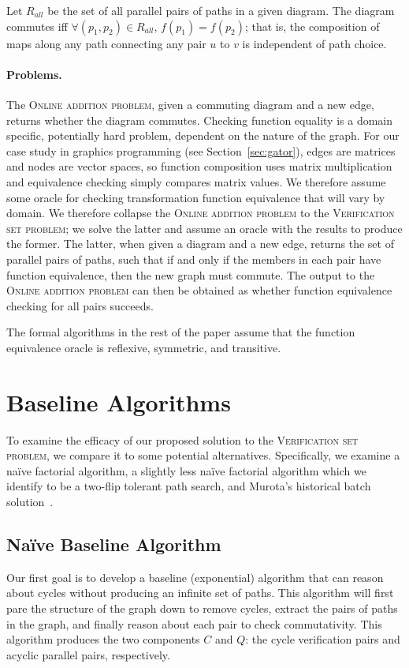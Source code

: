 \documentclass[sigplan,review]{acmart}
\begin{document}
Let $R_{all}$ be the set of all parallel pairs of paths in a given diagram.
The diagram commutes iff
$\forall (p_1,p_2)\in R_{all}$,
$f(p_1)=f(p_2)$; that is, the composition of maps along any path connecting any pair $u$ to $v$ is independent of path choice.

\paragraph{Problems.}

The \textsc{Online addition problem}, given a commuting diagram and a new edge, returns whether the diagram commutes.
Checking function equality is a domain specific, potentially hard problem, dependent on the nature of the graph.
For our case study in graphics programming (see Section~\ref{sec:gator}), edges are matrices and nodes are vector spaces, so function composition uses matrix multiplication and equivalence checking simply compares matrix values.
We therefore assume some oracle for checking transformation function equivalence that will vary by domain.
%
We therefore collapse the \textsc{Online addition problem} to the \textsc{Verification set problem}; we solve the latter and assume an oracle with the results to produce the former.
The latter, when given a diagram and a new edge, returns the set of parallel pairs of paths, such that if and only if the members in each pair have function equivalence, then the new graph must commute.
The output to the \textsc{Online addition problem} can then be obtained as whether function equivalence checking for all pairs succeeds.

The formal algorithms in the rest of the paper assume that the function equivalence oracle is reflexive, symmetric, and transitive.

\section{Baseline Algorithms}

To examine the efficacy of our proposed solution to the \textsc{Verification set problem}, we compare it to some potential alternatives.
Specifically, we examine a na\"{i}ve factorial algorithm, a slightly less na\"{i}ve factorial algorithm which we identify to be a two-flip tolerant path search, and Murota's historical batch solution~\cite{commutative}.

\subsection{Na\"{i}ve Baseline Algorithm}
Our first goal is to develop a baseline (exponential) algorithm that can reason about cycles without producing an infinite set of paths.  This algorithm will first pare the structure of the graph down to remove cycles, extract the pairs of paths in the graph, and finally reason about each pair to check commutativity.  This algorithm produces the two components $C$ and $Q$: the cycle verification pairs and acyclic parallel pairs, respectively.
\end{document}
